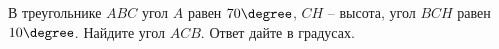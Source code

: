 \begin{ex}
	\begin{condition}
		В треугольнике \( ABC \) угол \( A \) равен \( 70 \degree\), \( CH \) – высота, угол \( BCH \) равен \( 10\degree \). Найдите угол \( ACB \). Ответ дайте в градусах.
	\end{condition}
\end{ex}